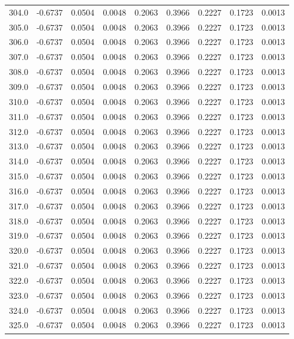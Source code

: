 \begin{longtable}{lrrrrrrrr}
304.0 & -0.6737 & 0.0504 & 0.0048 & 0.2063 & 0.3966 & 0.2227 & 0.1723 & 0.0013 \\
305.0 & -0.6737 & 0.0504 & 0.0048 & 0.2063 & 0.3966 & 0.2227 & 0.1723 & 0.0013 \\
306.0 & -0.6737 & 0.0504 & 0.0048 & 0.2063 & 0.3966 & 0.2227 & 0.1723 & 0.0013 \\
307.0 & -0.6737 & 0.0504 & 0.0048 & 0.2063 & 0.3966 & 0.2227 & 0.1723 & 0.0013 \\
308.0 & -0.6737 & 0.0504 & 0.0048 & 0.2063 & 0.3966 & 0.2227 & 0.1723 & 0.0013 \\
309.0 & -0.6737 & 0.0504 & 0.0048 & 0.2063 & 0.3966 & 0.2227 & 0.1723 & 0.0013 \\
310.0 & -0.6737 & 0.0504 & 0.0048 & 0.2063 & 0.3966 & 0.2227 & 0.1723 & 0.0013 \\
311.0 & -0.6737 & 0.0504 & 0.0048 & 0.2063 & 0.3966 & 0.2227 & 0.1723 & 0.0013 \\
312.0 & -0.6737 & 0.0504 & 0.0048 & 0.2063 & 0.3966 & 0.2227 & 0.1723 & 0.0013 \\
313.0 & -0.6737 & 0.0504 & 0.0048 & 0.2063 & 0.3966 & 0.2227 & 0.1723 & 0.0013 \\
314.0 & -0.6737 & 0.0504 & 0.0048 & 0.2063 & 0.3966 & 0.2227 & 0.1723 & 0.0013 \\
315.0 & -0.6737 & 0.0504 & 0.0048 & 0.2063 & 0.3966 & 0.2227 & 0.1723 & 0.0013 \\
316.0 & -0.6737 & 0.0504 & 0.0048 & 0.2063 & 0.3966 & 0.2227 & 0.1723 & 0.0013 \\
317.0 & -0.6737 & 0.0504 & 0.0048 & 0.2063 & 0.3966 & 0.2227 & 0.1723 & 0.0013 \\
318.0 & -0.6737 & 0.0504 & 0.0048 & 0.2063 & 0.3966 & 0.2227 & 0.1723 & 0.0013 \\
319.0 & -0.6737 & 0.0504 & 0.0048 & 0.2063 & 0.3966 & 0.2227 & 0.1723 & 0.0013 \\
320.0 & -0.6737 & 0.0504 & 0.0048 & 0.2063 & 0.3966 & 0.2227 & 0.1723 & 0.0013 \\
321.0 & -0.6737 & 0.0504 & 0.0048 & 0.2063 & 0.3966 & 0.2227 & 0.1723 & 0.0013 \\
322.0 & -0.6737 & 0.0504 & 0.0048 & 0.2063 & 0.3966 & 0.2227 & 0.1723 & 0.0013 \\
323.0 & -0.6737 & 0.0504 & 0.0048 & 0.2063 & 0.3966 & 0.2227 & 0.1723 & 0.0013 \\
324.0 & -0.6737 & 0.0504 & 0.0048 & 0.2063 & 0.3966 & 0.2227 & 0.1723 & 0.0013 \\
325.0 & -0.6737 & 0.0504 & 0.0048 & 0.2063 & 0.3966 & 0.2227 & 0.1723 & 0.0013 \\

\end{longtable}
